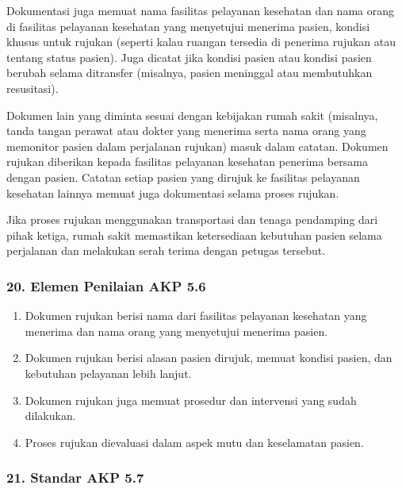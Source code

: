\documentclass[
]{book}
\providecommand{\tightlist}{%
  \setlength{\itemsep}{0pt}\setlength{\parskip}{0pt}}
\begin{document}
Dokumentasi juga memuat nama fasilitas pelayanan kesehatan dan nama orang di fasilitas pelayanan kesehatan yang menyetujui menerima pasien, kondisi khusus untuk rujukan (seperti kalau ruangan tersedia di penerima rujukan atau tentang status pasien). Juga dicatat jika kondisi pasien atau kondisi pasien berubah selama ditransfer (misalnya, pasien meninggal atau membutuhkan resusitasi).

Dokumen lain yang diminta sesuai dengan kebijakan rumah sakit (misalnya, tanda tangan perawat atau dokter yang menerima serta nama orang yang memonitor pasien dalam perjalanan rujukan) masuk dalam catatan. Dokumen rujukan diberikan kepada fasilitas pelayanan kesehatan penerima bersama dengan pasien.
Catatan setiap pasien yang dirujuk ke fasilitas pelayanan kesehatan lainnya memuat juga dokumentasi selama proses rujukan.

Jika proses rujukan menggunakan transportasi dan tenaga pendamping dari pihak ketiga, rumah sakit memastikan ketersediaan kebutuhan pasien selama perjalanan dan melakukan serah terima dengan petugas tersebut.

\hypertarget{elemen-penilaian-akp-5.6}{%
\subsubsection*{20. Elemen Penilaian AKP 5.6}\label{elemen-penilaian-akp-5.6}}

\begin{enumerate}
\def\labelenumi{\alph{enumi}.}
\tightlist
\item
  Dokumen rujukan berisi nama dari fasilitas pelayanan kesehatan yang menerima dan nama orang yang menyetujui menerima pasien.
\item
  Dokumen rujukan berisi alasan pasien dirujuk, memuat kondisi pasien, dan kebutuhan pelayanan lebih lanjut.
\item
  Dokumen rujukan juga memuat prosedur dan intervensi yang sudah dilakukan.
\item
  Proses rujukan dievaluasi dalam aspek mutu dan keselamatan pasien.
\end{enumerate}

\hypertarget{standar-akp-5.7}{%
\subsubsection*{21. Standar AKP 5.7}\label{standar-akp-5.7}}
\end{document}

